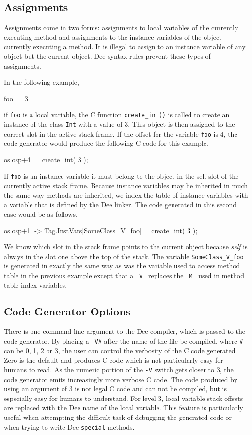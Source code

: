 \subsection{Assignments}

Assignments come in two forms: assignments to local variables of the
currently executing method and assignments to the instance variables
of the object currently executing a method.  It is illegal to assign
to an instance variable of any object but the current object.  Dee
syntax rules prevent these types of assignments.

In the following example,
\begin{prog}
\>    foo := 3
\end{prog}
if {\tt foo} is a local variable, the C function {\tt create\_int()} is
called to create an instance of the class {\tt Int} with a value of 3.
This object is then assigned to the correct slot in the active stack
frame.  If the offset for the variable {\tt foo} is 4, the code
generator would produce the following C code for this example.
\begin{prog}
\>    os[osp+4] = create\_int( 3 );
\end{prog}

If {\tt foo} is an instance variable it must belong to the object in
the self slot of the currently active stack frame.  Because
instance variables may be inherited in much the same way methods are
inherited, we index the table of instance variables with a variable
that is defined by the Dee linker.  The code generated in this second
case would be as follows.
\begin{prog}
\>    os[osp+1] -> Tag.InstVars[SomeClass\_V\_foo] = create\_int( 3 );
\end{prog}
We know which slot in the stack frame points to the current object
because {\em self} is always in the slot one above the top of the
stack.  The variable {\tt SomeClass\_V\_foo} is generated in exactly
the same way as was the variable used to access method table in the
previous example except that a {\tt \_V\_} replaces the {\tt \_M\_}
used in method table index variables.

\subsection{Code Generator Options}

There is one command line argument to the Dee compiler, which is
passed to the code generator.  By placing a {\tt -V\#} after the name
of the file be compiled, where {\tt \#} can be 0, 1, 2 or 3, the user
can control the verbosity of the C code generated.  Zero is the
default and produces C code which is not particularly easy for humans
to read.  As the numeric portion of the {\tt -V} switch gets closer to
3, the code generator emits increasingly more verbose C code.  The
code produced by using an argument of 3 is not legal C code and can
not be compiled, but is especially easy for humans to understand.  For
level 3, local variable stack offsets are replaced with the Dee name
of the local variable.  This feature is particularly useful when
attempting the difficult task of debugging the generated code or when
trying to write Dee {\tt special} methods.



